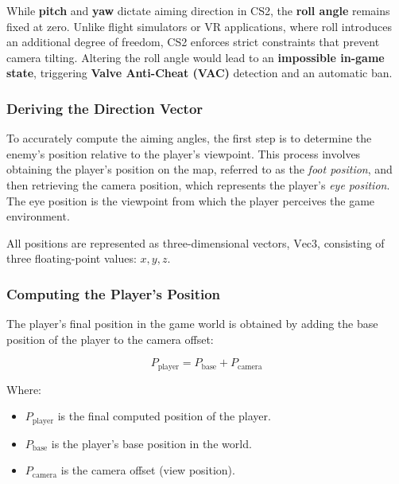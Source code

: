 
While \textbf{pitch} and \textbf{yaw} dictate aiming direction in CS2, the \textbf{roll angle} remains fixed at zero. Unlike flight simulators or VR applications, where roll introduces an additional degree of freedom, CS2 enforces strict constraints that prevent camera tilting. Altering the roll angle would lead to an \textbf{impossible in-game state}, triggering \textbf{Valve Anti-Cheat (VAC)} detection and an automatic ban.



\subsubsection{Deriving the Direction Vector}

To accurately compute the aiming angles, the first step is to determine the enemy's position relative to the player's viewpoint. This process involves obtaining the player's position on the map, referred to as the \emph{foot position}, and then retrieving the camera position, which represents the player's \emph{eye position}. The eye position is the viewpoint from which the player perceives the game environment.

All positions are represented as three-dimensional vectors, \( \text{Vec3} \), consisting of three floating-point values: \( x, y, z \).

\subsubsection{Computing the Player’s Position}

The player's final position in the game world is obtained by adding the base position of the player to the camera offset:

\[
P_{\text{player}} = P_{\text{base}} + P_{\text{camera}}
\]

Where:
\begin{itemize}
    \item \( P_{\text{player}} \) is the final computed position of the player.
    \item \( P_{\text{base}} \) is the player's base position in the world.
    \item \( P_{\text{camera}} \) is the camera offset (view position).
\end{itemize}

